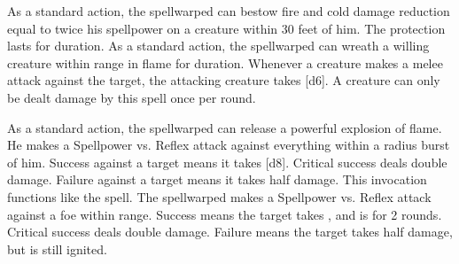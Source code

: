             As a standard action, the spellwarped can bestow fire and cold damage reduction equal to twice his spellpower on a creature within 30 feet of him.
            The protection lasts for \durshort duration.
            As a standard action, the spellwarped can wreath a willing creature within \rngclose range in flame for \durshort duration.
            Whenever a creature makes a melee attack against the target, the attacking creature takes [d6].
            A creature can only be dealt damage by this spell once per round.

            As a standard action, the spellwarped can release a powerful explosion of flame.
            He makes a Spellpower vs. Reflex attack against everything within a \areamed radius burst of him.
            Success against a target means it takes [d8].
            Critical success deals double damage.
            Failure against a target means it takes half damage.
            This invocation functions like the  spell.
            The spellwarped makes a Spellpower vs. Reflex attack against a foe within \rngclose range.
            Success means the target takes , and is \ignited for 2 rounds.
            Critical success deals double damage.
            Failure means the target takes half damage, but is still ignited.

